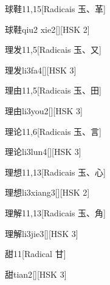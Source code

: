 \begin{entry}{球鞋}{11,15}[Radicais ⽟、⾰]
  \begin{phonetics}{球鞋}{qiu2 xie2}[][HSK 2]
  \end{phonetics}
\end{entry}

\begin{entry}{理发}{11,5}[Radicais ⽟、⼜]
  \begin{phonetics}{理发}{li3fa4}[][HSK 3]
  \end{phonetics}
\end{entry}

\begin{entry}{理由}{11,5}[Radicais ⽟、⽥]
  \begin{phonetics}{理由}{li3you2}[][HSK 3]
  \end{phonetics}
\end{entry}

\begin{entry}{理论}{11,6}[Radicais ⽟、⾔]
  \begin{phonetics}{理论}{li3lun4}[][HSK 3]
  \end{phonetics}
\end{entry}

\begin{entry}{理想}{11,13}[Radicais ⽟、⼼]
  \begin{phonetics}{理想}{li3xiang3}[][HSK 2]
  \end{phonetics}
\end{entry}

\begin{entry}{理解}{11,13}[Radicais ⽟、⾓]
  \begin{phonetics}{理解}{li3jie3}[][HSK 3]
  \end{phonetics}
\end{entry}

\begin{entry}{甜}{11}[Radical ⽢]
  \begin{phonetics}{甜}{tian2}[][HSK 3]
  \end{phonetics}
\end{entry}

